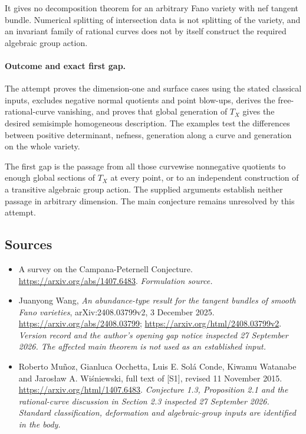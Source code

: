 \documentclass[11pt]{article}
\begin{document}
It gives no decomposition theorem for an arbitrary Fano variety with
nef tangent bundle. Numerical splitting of intersection data is not
splitting of the variety, and an invariant family of rational curves
does not by itself construct the required algebraic group action.

\paragraph{Outcome and exact first gap.}
The attempt proves the dimension-one and surface cases using the stated
classical inputs, excludes negative normal quotients and point blow-ups,
derives the free-rational-curve vanishing, and proves that global
generation of $T_X$ gives the desired semisimple homogeneous description.
The examples test the differences between positive determinant, nefness,
generation along a curve and generation on the whole variety.

The first gap is the passage from all those curvewise nonnegative
quotients to enough global sections of $T_X$ at every point, or to
an independent construction of a transitive algebraic group action.
The supplied arguments establish neither passage in arbitrary dimension.
The main conjecture remains unresolved by this attempt.

\subsection{Sources}
\begin{itemize}
\item[S1]A survey on the Campana-Peternell Conjecture.
\url{https://arxiv.org/abs/1407.6483}.
\textit{Formulation source.}
\item[E1]Juanyong Wang, \emph{An abundance-type result for the tangent
bundles of smooth Fano varieties}, arXiv:2408.03799v2,
3 December 2025.
\url{https://arxiv.org/abs/2408.03799};
\url{https://arxiv.org/html/2408.03799v2}.
\textit{Version record and the author's opening gap notice inspected
27 September 2026. The affected main theorem is not used as an
established input.}
\item[E2]Roberto Mu\~noz, Gianluca Occhetta, Luis E. Sol\'a Conde,
Kiwamu Watanabe and Jaros\l aw A. Wi\'sniewski, full text of [S1],
revised 11 November 2015.
\url{https://arxiv.org/html/1407.6483}.
\textit{Conjecture 1.3, Proposition 2.1 and the rational-curve discussion
in Section 2.3 inspected 27 September 2026. Standard classification,
deformation and algebraic-group inputs are identified in the body.}
\end{itemize}
\end{document}
